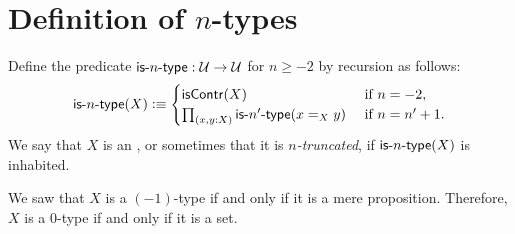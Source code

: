 \documentclass[hott-all.tex]{subfiles}
\begin{document}
\section{Definition of \texorpdfstring{$n$}{n}-types}
% 
% 
\begin{defn}
  Define the predicate $\mathsf{is}\mbox{-}{n}\mbox{-}\mathsf{type} : \mathcal{U} \to \mathcal{U}$ for $n \geq -2$ by recursion as follows:
  \[ \istype{n}(X) \defeq
  \begin{cases}
    \iscontr(X) & \text{ if } n = -2, \\
    \prd{x,y : X} \istype{n'}(\id[X]{x}{y}) & \text{ if } n = n'+1.
  \end{cases}
  \]
  We say that $X$ is an , or sometimes that it is \emph{$n$-truncated},
 if $\mathsf{is}\mbox{-}{n}\mbox{-}\mathsf{type}(X)$ is inhabited.
\end{defn}
% 
% 
\begin{eg}
  We saw that $X$ is a $(-1)$-type if and only if it is a mere proposition.
  Therefore, $X$ is a $0$-type if and only if it is a set.
\end{eg}
% 
\end{document}
